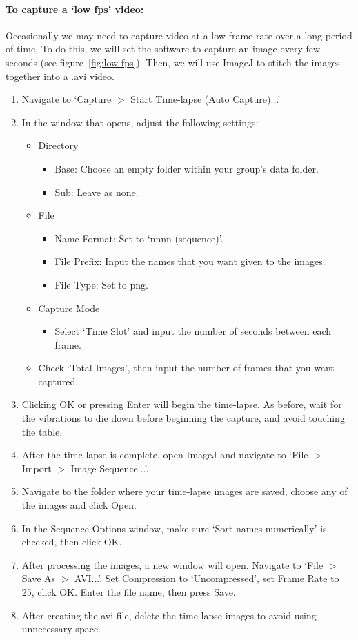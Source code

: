 \paragraph*{To capture a `low fps' video:}
Occasionally we may need to capture video at a low frame rate over a long period of time.
To do this, we will set the software to capture an image every few seconds (see figure~\ref{fig:low-fps}).
Then, we will use ImageJ to stitch the images together into a .avi video.
\begin{enumerate}
\item Navigate to `Capture $>$ Start Time-lapse (Auto Capture)...'
\item In the window that opens, adjust the following settings:
	\begin{itemize}
	\item Directory
		\begin{itemize}
		\item Base: Choose an empty folder within your group's data folder.
		\item Sub: Leave as none.
		\end{itemize}
	\item File
		\begin{itemize}
		\item Name Format: Set to `nnnn (sequence)'.
		\item File Prefix: Input the names that you want given to the images.
		\item File Type: Set to png.
		\end{itemize}
	\item Capture Mode
		\begin{itemize}
		\item Select `Time Slot' and input the number of seconds between each frame.
		\end{itemize}
	\item Check `Total Images', then input the number of frames that you want captured.
	\end{itemize}
\item Clicking OK or pressing Enter will begin the time-lapse. As before, wait for the vibrations to die down before beginning the capture, and avoid touching the table.
\item After the time-lapse is complete, open ImageJ and navigate to `File $>$ Import $>$ Image Sequence...'.
\item Navigate to the folder where your time-lapse images are saved, choose any of the images and click Open.
\item In the Sequence Options window, make sure `Sort names numerically' is checked, then click OK.
\item After processing the images, a new window will open. Navigate to `File $>$ Save As $>$ AVI...'. Set Compression to `Uncompressed', set Frame Rate to 25, click OK. Enter the file name, then press Save.
\item After creating the avi file, delete the time-lapse images to avoid using unnecessary space.
\end{enumerate}

